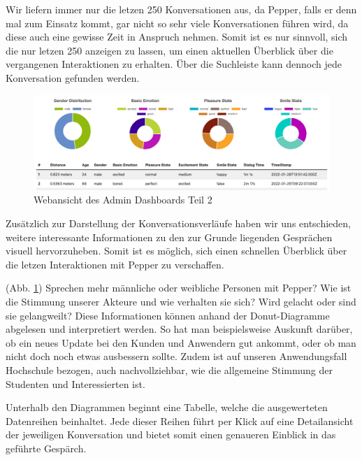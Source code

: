 Wir liefern immer nur die letzen 250 Konversationen aus, da Pepper, falls er denn
mal zum Einsatz kommt, gar nicht so sehr viele Konversationen führen wird, da diese auch eine gewisse Zeit in Anspruch nehmen. Somit ist es nur sinnvoll, sich die nur letzen 250 anzeigen zu lassen, um einen aktuellen Überblick über die vergangenen Interaktionen zu erhalten. Über die Suchleiste kann dennoch jede Konversation gefunden werden.\\


\begin{figure}[H]
    \includegraphics[width=\textwidth]{Figures/NodeChapter/adminDashboard2.png}
    \caption{Webansicht des Admin Dashboards Teil 2}
    \label{fig:admindashboard2}
    \centering
\end{figure}

Zusätzlich zur Darstellung der Konversationsverläufe haben wir uns entschieden, weitere interessante Informationen zu den zur Grunde liegenden Gesprächen visuell hervorzuheben. Somit ist es möglich, sich einen schnellen Überblick
über die letzen Interaktionen mit Pepper zu verschaffen.

(Abb. \ref{fig:admindashboard2}) Sprechen mehr männliche oder weibliche Personen
mit Pepper? Wie ist die Stimmung unserer Akteure und wie verhalten sie sich? Wird gelacht oder sind sie gelangweilt? Diese Informationen können anhand der Donut-Diagramme abgelesen und interpretiert werden. So hat man beispielsweise Auskunft darüber, ob ein neues Update bei den Kunden und Anwendern gut ankommt, oder ob man nicht doch noch etwas ausbessern sollte. Zudem ist auf unseren Anwendungsfall Hochschule bezogen, auch nachvollziehbar, wie die allgemeine Stimmung der Studenten und Interessierten ist.

Unterhalb den Diagrammen beginnt eine Tabelle, welche die ausgewerteten Datenreihen beinhaltet. Jede dieser Reihen führt per Klick auf eine Detailansicht der jeweiligen Konversation und bietet somit einen genaueren Einblick in das geführte
Gespärch.

